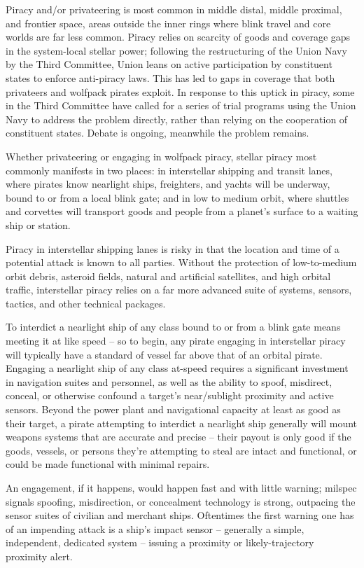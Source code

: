 Piracy and/or privateering is most common in middle distal, middle proximal, and frontier space,
areas outside the inner rings where blink travel and core worlds are far less common. Piracy
relies on scarcity of goods and coverage gaps in the system-local stellar power;
following the restructuring of the Union Navy by the Third Committee, Union leans on active
participation by constituent states to enforce anti-piracy laws. This has led to gaps in coverage
that both privateers and wolfpack pirates exploit. In response to this uptick in piracy, some in the
Third Committee have called for a series of trial programs using the Union Navy to address the
problem directly, rather than relying on the cooperation of constituent states. Debate is ongoing,
meanwhile the problem remains.

Whether privateering or engaging in wolfpack piracy, stellar piracy most commonly manifests in
two places: in interstellar shipping and transit lanes, where pirates know nearlight ships,
freighters, and yachts will be underway, bound to or from a local blink gate; and in low to
medium orbit, where shuttles and corvettes will transport goods and people from a planet’s
surface to a waiting ship or station.

Piracy in interstellar shipping lanes is risky in that the location and time of a potential attack is
known to all parties. Without the protection of low-to-medium orbit debris, asteroid fields, natural
and artificial satellites, and high orbital traffic, interstellar piracy relies on a far more advanced
suite of systems, sensors, tactics, and other technical packages.

To interdict a nearlight ship of any class bound to or from a blink gate means meeting it at like
speed -- so to begin, any pirate engaging in interstellar piracy will typically have a standard of
vessel far above that of an orbital pirate. Engaging a nearlight ship of any class at-speed requires
a significant investment in navigation suites and personnel, as well as the ability to spoof,
misdirect, conceal, or otherwise confound a target’s near/sublight proximity and active sensors.
Beyond the power plant and navigational capacity at least as good as their target, a pirate
attempting to interdict a nearlight ship generally will mount weapons systems that are accurate
and precise -- their payout is only good if the goods, vessels, or persons they’re attempting to
steal are intact and functional, or could be made functional with minimal repairs.

An engagement, if it happens, would happen fast and with little warning; milspec signals
spoofing, misdirection, or concealment technology is strong, outpacing the sensor suites of
civilian and merchant ships. Oftentimes the first warning one has of an impending attack is a
ship’s impact sensor -- generally a simple, independent, dedicated system -- issuing a proximity
or likely-trajectory proximity alert.

